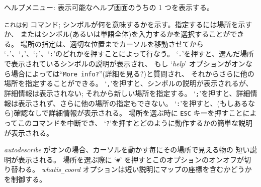 \blist{}
\item[\tb{?}]
ヘルプメニュー: 表示可能なヘルプ画面のうちの 1 つを表示する。
\item[\tb{/}]
{\tt これは何} コマンド;
シンボルが何を意味するかを示す。指定するには場所を示すか、
またはシンボル(あるいは単語全体)を入力するかを選択することができる。
場所の指定は、適切な位置までカーソルを移動させてから
`{\tt .}'、`{\tt ,}'、`{\tt ;}'、`{\tt :}'のどれかを押すことによって行なう。
`{\tt .}'を押すと、選んだ場所で表示されているシンボルの説明が表示され、
もし `{\it help\/}'
オプションがオンなら場合によっては``{\tt More info?}''(詳細を見る?)と質問され、
それからさらに他の場所を指定することができる。
`{\tt ,}'を押すと、シンボルの説明が表示されるが、詳細情報は表示されない;
それから新しい場所を指定する。
`{\tt ;}'を押すと、詳細情報は表示されず、さらに他の場所の指定もできない。
`{\tt :}'を押すと、(もしあるなら)確認なしで詳細情報が表示される。
場所を選ぶ時に {\tt ESC} キーを押すことによってこのコマンドを中断でき、
`{\tt ?}'を押すとどのように動作するかの簡単な説明が表示される。

{\it autodescribe\/} がオンの場合、カーソルを動かす毎にその場所で見える物の
短い説明が表示される。
場所を選ぶ際に `{\tt \#}' を押すとこのオプションのオンオフが切り替わる。
{\it whatis\verb+_+coord\/}
オプションは短い説明にマップの座標を含むかどうかを制御する。

